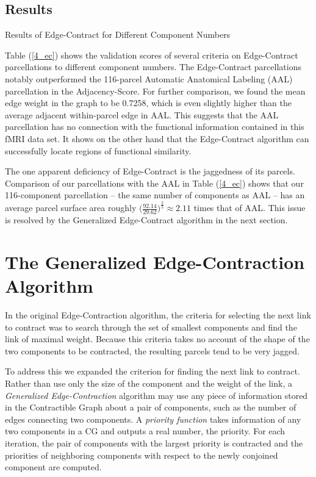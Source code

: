 \subsection{Results}

\begin{table}
\caption{Results of Edge-Contract for Different Component Numbers}
\label{4_ec}
\end{table}

Table (\ref{4_ec}) shows the validation scores of several criteria on
Edge-Contract parcellations to different component numbers.
The Edge-Contract parcellations notably outperformed the 116-parcel
Automatic Anatomical Labeling (AAL) parcellation in the
Adjacency-Score. For further comparison, we found the mean edge weight
in the graph to be 0.7258, which is even slightly higher than the
average adjacent within-parcel edge in AAL. This suggests that the AAL
parcellation has no connection with the functional information
contained in this fMRI data set. It shows on the other hand that the
Edge-Contract algorithm can successfully locate regions of functional
similarity.

The one apparent deficiency of Edge-Contract is the jaggedness of its
parcels. Comparison of our parcellations with the AAL in Table
(\ref{4_ec}) shows that our 116-component parcellation -- the same
number of components as AAL -- has an average parcel surface area
roughly $\big( \frac{92.14}{29.62} \big)^{\frac{2}{3} }\approx 2.11$
times that of AAL. This issue is resolved by the Generalized
Edge-Contract algorithm in the next section.

\section{The Generalized Edge-Contraction Algorithm}

In the original Edge-Contraction algorithm, the criteria for selecting
the next link to contract was to search through the set of smallest
components and find the link of maximal weight. Because this criteria
takes no account of the shape of the two components to be contracted,
the resulting parcels tend to be very jagged.

To address this we expanded the criterion for finding the next link
to contract. Rather than use only the size of the component and the
weight of the link, a \textit{Generalized Edge-Contraction} algorithm
may use any piece of information stored in the Contractible Graph about
a pair of components, such as the number of edges connecting two
components. A \textit{priority function} takes information of any two
components in a CG and outputs a real number, the priority. For each
iteration, the pair of components with the largest priority is
contracted and the priorities of neighboring components with respect
to the newly conjoined component are computed.


